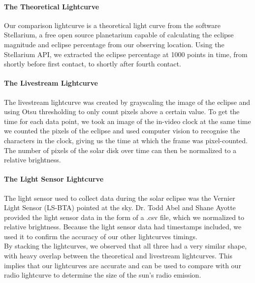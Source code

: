 \paragraph{The Theoretical Lightcurve}
Our comparison lightcurve is a theoretical light curve from the software Stellarium, a free open source planetarium capable of calculating the eclipse magnitude and eclipse percentage from our observing location.
Using the Stellarium API, we extracted the eclipse percentage at 1000 points in time, from shortly before first contact, to shortly after fourth contact.
\paragraph{The Livestream Lightcurve}
The livestream lightcurve was created by grayscaling the image of the eclipse and using Otsu thresholding to only count pixels above a certain value.
To get the time for each data point, we took an image of the in-video clock at the same time we counted the pixels of the eclipse and used computer vision to recognise the characters in the clock, giving us the time at which the frame was pixel-counted.
The number of pixels of the solar disk over time can then be normalized to a relative brightness.
\paragraph{The Light Sensor Lightcurve}
The light sensor used to collect data during the solar eclipse was the Vernier Light Sensor (LS-BTA) pointed at the sky.
Dr. Todd Abel and Shane Ayotte provided the light sensor data in the form of a .csv file, which we normalized to relative brightness.
Because the light sensor data had timestamps included, we used it to confirm the accuracy of our other lightcurves timings.
\\
By stacking the lightcurves, we observed that all three had a very similar shape, with heavy overlap between the theoretical and livestream lightcurves.
This implies that our lightcurves are accurate and can be used to compare with our radio lightcurve to determine the size of the sun’s radio emission.
